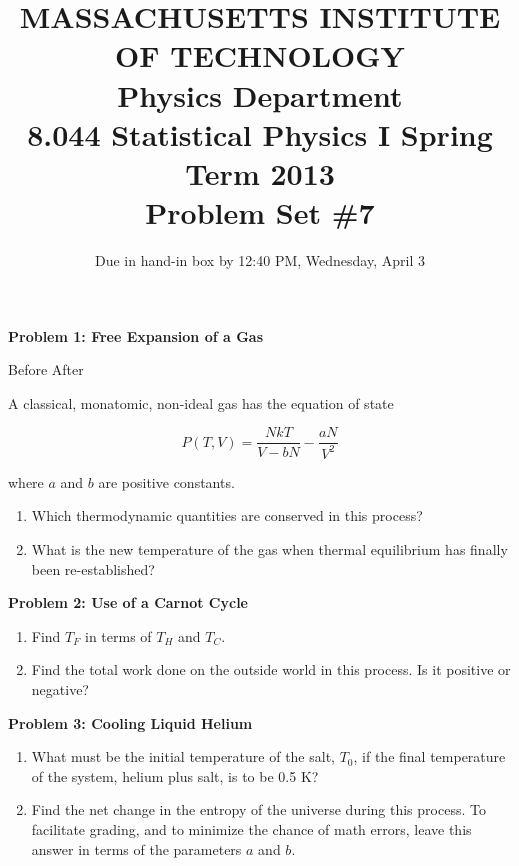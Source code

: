 \documentclass{article}
\begin{document}
\title{MASSACHUSETTS INSTITUTE OF TECHNOLOGY\\ Physics Department\\ 8.044 Statistical Physics I Spring Term 2013\\ Problem Set \#7}
\date{Due in hand-in box by 12:40 PM, Wednesday, April 3}
\maketitle

\noindent \textbf{Problem 1: Free Expansion of a Gas}

Before After

\noindent A classical, monatomic, non-ideal gas has the equation of state

\begin{equation}
P (T, V ) = \frac{{NkT}}{{V − bN}} − \frac{{aN}}{{V^2}}
\end{equation}

\noindent where $a$ and $b$ are positive constants.

\begin{enumerate}
	\item Which thermodynamic quantities are conserved in this process?
	\item What is the new temperature of the gas when thermal equilibrium has finally been re-established?
\end{enumerate}

\noindent \textbf{Problem 2: Use of a Carnot Cycle}

\begin{enumerate}
	\item Find $T_F$ in terms of $T_H$ and $T_C$.
	\item Find the total work done on the outside world in this process. Is it positive or negative?
\end{enumerate}

\noindent \textbf{Problem 3: Cooling Liquid Helium}

\begin{enumerate}
	\item What must be the initial temperature of the salt, $T_0$, if the final temperature of the system, helium plus salt, is to be 0.5 K?
	\item Find the net change in the entropy of the universe during this process. To facilitate grading, and to minimize the chance of math errors, leave this answer in terms of the parameters $a$ and $b$.
\end{enumerate}
\end{document}
